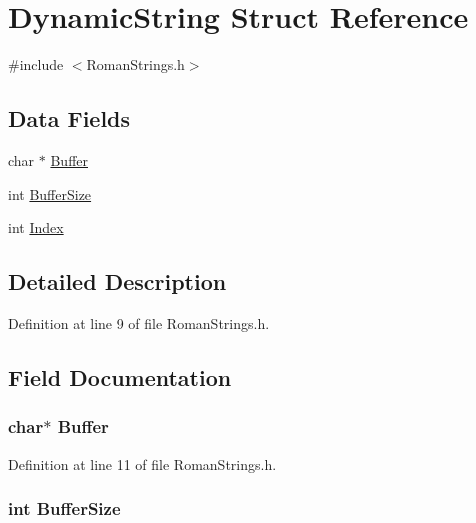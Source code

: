\hypertarget{struct_dynamic_string}{}\section{Dynamic\+String Struct Reference}
\label{struct_dynamic_string}


{\ttfamily \#include $<$Roman\+Strings.\+h$>$}

\subsection*{Data Fields}
\begin{DoxyCompactItemize}
\item 
char $\ast$ \hyperlink{struct_dynamic_string_ad1bb1e1f60b391156e2a18c4a7fe6033}{Buffer}
\item 
int \hyperlink{struct_dynamic_string_ae24de3d1938064e4a05dd06bc6b422d4}{Buffer\+Size}
\item 
int \hyperlink{struct_dynamic_string_a075e1e3c9dd399cef584d7338cc37938}{Index}
\end{DoxyCompactItemize}


\subsection{Detailed Description}


Definition at line 9 of file Roman\+Strings.\+h.



\subsection{Field Documentation}
\subsubsection[{\texorpdfstring{Buffer}{Buffer}}]{\setlength{\rightskip}{0pt plus 5cm}char$\ast$ Buffer}\hypertarget{struct_dynamic_string_ad1bb1e1f60b391156e2a18c4a7fe6033}{}\label{struct_dynamic_string_ad1bb1e1f60b391156e2a18c4a7fe6033}


Definition at line 11 of file Roman\+Strings.\+h.

\subsubsection[{\texorpdfstring{Buffer\+Size}{BufferSize}}]{\setlength{\rightskip}{0pt plus 5cm}int Buffer\+Size}\hypertarget{struct_dynamic_string_ae24de3d1938064e4a05dd06bc6b422d4}{}\label{struct_dynamic_string_ae24de3d1938064e4a05dd06bc6b422d4}


